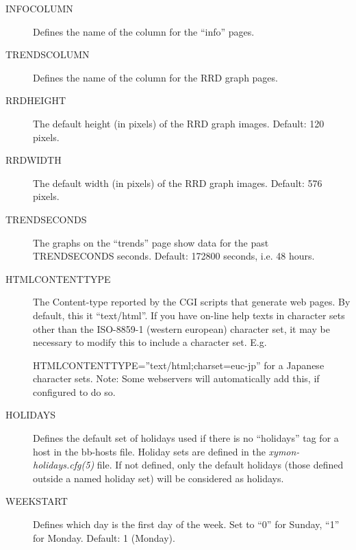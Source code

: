 \begin{description}
 

\item[INFOCOLUMN] Defines the name of the column for the ``info'' pages. 

 

\item[TRENDSCOLUMN] Defines the name of the column for the RRD graph pages. 

 

\item[RRDHEIGHT] The default height (in pixels) of the RRD graph images. Default: 120 pixels. 

 

\item[RRDWIDTH] The default width (in pixels) of the RRD graph images. Default: 576 pixels. 

 

\item[TRENDSECONDS] The graphs on the ``trends'' page show data for the past TRENDSECONDS seconds. Default: 172800 seconds, i.e. 48 hours. 

 

\item[HTMLCONTENTTYPE] The Content-type reported by the CGI scripts that generate web pages. By default, this it ``text/html''. If you have on-line help texts in character sets other than the ISO-8859-1 (western european) character set, it may be necessary to modify this to include a character set. E.g.  
 
HTMLCONTENTTYPE=''text/html;charset=euc-jp''  
 for a Japanese character sets. Note: Some webservers will automatically add this, if configured to do so. 

 

\item[HOLIDAYS] Defines the default set of holidays used if there is no ``holidays'' tag for a host in the bb-hosts file. Holiday sets are defined in the \emph{xymon-holidays.cfg(5)}
 file. If not defined, only the default holidays (those defined outside a named holiday set) will be considered as holidays. 

 

\item[WEEKSTART] Defines which day is the first day of the week. Set to ``0'' for Sunday, ``1'' for Monday. Default: 1 (Monday). 

 


 


\end{description}

